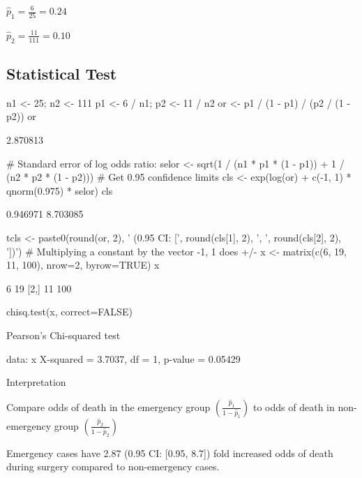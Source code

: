 \bi
\item $\hat{p}_1 = \frac{6}{25} = 0.24$
\item $\hat{p}_2 = \frac{11}{111} = 0.10$
\ei

\subsection{Statistical Test}
\begin{Schunk}
\begin{Sinput}
n1 <- 25;     n2 <- 111
p1 <- 6 / n1; p2 <- 11 / n2
or <- p1 / (1 - p1) / (p2 / (1 - p2))
or
\end{Sinput}
\begin{Soutput}
[1] 2.870813
\end{Soutput}
\begin{Sinput}
# Standard error of log odds ratio:
selor <- sqrt(1 / (n1 * p1 * (1 - p1)) + 1 / (n2 * p2 * (1 - p2)))
# Get 0.95 confidence limits
cls <- exp(log(or) + c(-1, 1) * qnorm(0.975) * selor)
cls
\end{Sinput}
\begin{Soutput}
[1] 0.946971 8.703085
\end{Soutput}
\begin{Sinput}
tcls <- paste0(round(or, 2), ' (0.95 CI: [', round(cls[1], 2),
               ', ', round(cls[2], 2), '])')
# Multiplying a constant by the vector -1, 1 does +/-
x <- matrix(c(6, 19, 11, 100), nrow=2, byrow=TRUE)
x
\end{Sinput}
\begin{Soutput}
     [,1] [,2]
[1,]    6   19
[2,]   11  100
\end{Soutput}
\begin{Sinput}
chisq.test(x, correct=FALSE)
\end{Sinput}
\begin{Soutput}

	Pearson's Chi-squared test

data:  x
X-squared = 3.7037, df = 1, p-value = 0.05429
\end{Soutput}
\end{Schunk}
\bi
\item Interpretation
 \bi
 \item Compare odds of death in the emergency group
   $\left(\frac{\hat{p}_1}{1-\hat{p}_1}\right)$ to odds of death in
   non-emergency group  $\left(\frac{\hat{p}_2}{1-\hat{p}_2}\right)$ 
 \item Emergency cases have 2.87 (0.95 CI: [0.95, 8.7]) fold
   increased odds of death during surgery compared to
   non-emergency cases. 
 \ei
\ei

